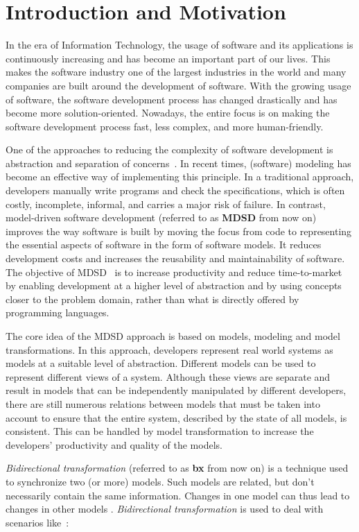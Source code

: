 \section{Introduction and Motivation}\label{sec:introduction}
In the era of Information Technology, the usage of software and its applications is continuously increasing and has become an important part of our lives. This makes the software industry one of the largest industries in the world and many companies are built around the development of software. With the growing usage of software, the software development process has changed drastically and has become more solution-oriented. Nowadays, the entire focus is on making the software development process fast, less complex, and more human-friendly. 

One of the approaches to reducing the complexity of software development is abstraction and separation of concerns~\cite{modeltransform}. In recent times, (software) modeling has become an effective way of implementing this principle. In a traditional approach, developers manually write programs and check the specifications, which is often costly, incomplete, informal, and carries a major risk of failure. In contrast, model-driven software development (referred to as \textbf{MDSD} from now on) improves the way software is built by moving the focus from code to representing the essential aspects of software in the form of software models. It reduces development costs and increases the reusability and maintainability of software. The objective of MDSD~\cite{modeltransform} is to increase productivity and reduce time-to-market by enabling development at a higher level of abstraction and by using concepts closer to the problem domain, rather than what is directly offered by programming languages.
 
The core idea of the MDSD approach is based on models, modeling and model transformations. In this approach, developers represent real world systems as models at a suitable level of abstraction. Different models can be used to represent different views of a system.  Although these views are separate and result in models that can be independently manipulated by different developers, there are still numerous relations between models that must be taken into account to ensure that the entire system, described by the state of all models, is consistent. This can be handled by model transformation to increase the developers' productivity and quality of the models.

\textit{Bidirectional transformation} (referred to as \textbf{bx} from now on) is a technique used to synchronize two (or more) models. Such models are related, but don't necessarily contain the same information. Changes in one model can thus lead to changes in other models \cite{bx-grace}.
\newline\newline\textit{Bidirectional transformation} is used to deal with scenarios like~\cite{bx-theoryandappl}:\\

